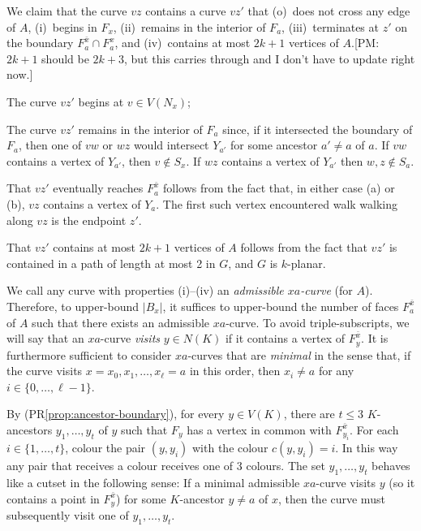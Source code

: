 \documentclass{patmorin}
\newcommand{\note}[2]{{\color{red}[#1:~#2]}}
\renewcommand{\propref}[1]{(PR\ref{prop:#1})}
\begin{document}
We claim that the curve $vz$ contains a curve $vz'$ that (o)~does not cross any edge of $A$, (i)~begins in $F_x$, (ii)~remains in the interior of $F_a$, (iii)~terminates at $z'$ on the boundary $F^{\bar{x}}_a\cap F^x_a$, and (iv)~contains at most $2k+1$ vertices of $A$.\note{PM}{$2k+1$ should be $2k+3$, but this carries through and I don't have to update right now.}
\begin{compactenum}[(i)]
  \item The curve $vz'$ begins at $v\in V(N_x)$;
  
  \item The curve $vz'$ remains in the interior of $F_a$ since, if it intersected the boundary of $F_a$, then one of $vw$ or $wz$ would intersect $Y_{a'}$ for some ancestor $a'\neq a$ of $a$.  If $vw$ contains a vertex of $Y_{a'}$, then $v\not\in S_x$.  If $wz$ contains a vertex of $Y_{a'}$ then $w,z\not\in S_a$. 

  \item That $vz'$ eventually reaches $F^{\bar{x}}_a$ follows from the fact that, in either case (a) or (b), $vz$ contains a vertex of $Y_a$.  The first such vertex encountered walk walking along $vz$ is the endpoint $z'$.
  
  \item That $vz'$ contains at most $2k+1$ vertices of $A$ follows from the fact that $vz'$ is contained in a path of length at most 2 in $G$, and $G$ is $k$-planar.
\end{compactenum}
We call any curve with properties (i)--(iv) an \emph{admissible $xa$-curve} (for $A$).  Therefore, to upper-bound $|B_x|$, it suffices to upper-bound the number of faces $F^{\bar{x}}_a$ of $A$ such that there exists an admissible $xa$-curve. To avoid triple-subscripts, we will say that an $xa$-curve \emph{visits} $y\in N(K)$ if it contains a vertex of $F^{\bar{x}}_y$.  It is furthermore sufficient to consider $xa$-curves that are \emph{minimal} in the sense that, if the curve visits $x=x_0,x_1,\ldots,x_\ell=a$ in this order, then $x_i\neq a$ for any $i\in\{0,\ldots,\ell-1\}$.

By \propref{ancestor-boundary}, for every $y\in V(K)$, there are $t\le 3$ $K$-ancestors $y_1,\ldots,y_t$ of $y$ such that $F_y$ has a vertex in common with $F^{\bar{x}}_{y_i}$. For each $i\in\{1,\ldots,t\}$, colour the pair $(y,y_i)$ with the colour $c(y,y_i)=i$. In this way any pair that receives a colour receives one of 3 colours.  The set $y_1,\ldots,y_t$ behaves like a cutset in the following sense:  If a minimal admissible $xa$-curve visits $y$ (so it contains a point in $F^{\bar{x}}_y$) for some $K$-ancestor $y\neq a$ of $x$, then the curve must subsequently visit one of $y_1,\ldots,y_t$.
\end{document}
